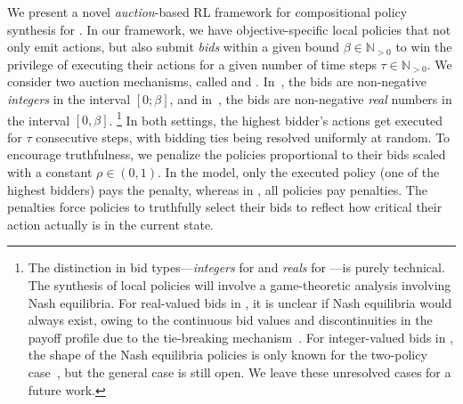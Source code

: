 \smallskip


We present a novel \textit{auction}-based RL framework for compositional policy synthesis for \momdps.
In our framework, we have objective-specific local policies that not only emit actions, but also submit \emph{bids} within a given bound $\beta\in \mathbb{N}_{>0}$ to win the privilege of executing their actions for a given number of time steps $\tau\in \mathbb{N}_{>0}$.
We consider two auction mechanisms, called \poorman and \allpay.
In~\poorman, the bids are non-negative \textit{integers} in the interval $[0;\beta]$, and in~\allpay, the bids are non-negative \textit{real} numbers in the interval $[0,\beta]$.%
\footnote{The distinction in bid types---\textit{integers} for \poorman and \textit{reals} for \allpay---is purely technical. 
The synthesis of local policies will involve a game-theoretic analysis involving Nash equilibria.
For real-valued bids in \poorman, it is unclear if Nash equilibria would always exist, owing to the continuous bid values and discontinuities in the payoff profile due to the tie-breaking mechanism~\cite{simon1990discontinuous}. 
For integer-valued bids in \allpay, the shape of the Nash equilibria policies is only known for the two-policy case~\cite{dziubinski2023discrete}, but the general case is still open.
We leave these unresolved cases for a future work.
}
In both settings, the highest bidder's actions get executed for $\tau$ consecutive steps, with bidding ties being resolved uniformly at random.
To encourage truthfulness, we penalize the policies proportional to their bids scaled with a constant $\rho\in (0,1)$.
In the \poorman model, only the executed policy (one of the highest bidders) pays the penalty, whereas in \allpay, all policies pay penalties.
The penalties force policies to truthfully select their bids to reflect how critical their action actually is in the current state.
